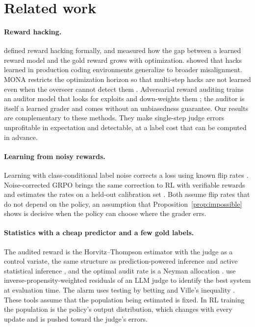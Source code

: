 \section{Related work}
\label{sec:related}

\paragraph{Reward hacking.}
\citet{skalse2022defining} defined reward hacking formally, and \citet{gao2023scaling} measured how the gap between a learned reward model and the gold reward grows with optimization. \citet{macdiarmid2025natural} showed that hacks learned in production coding environments generalize to broader misalignment. MONA restricts the optimization horizon so that multi-step hacks are not learned even when the overseer cannot detect them \citep{farquhar2025mona}. Adversarial reward auditing trains an auditor model that looks for exploits and down-weights them \citep{beigi2026adversarial}; the auditor is itself a learned grader and comes without an unbiasedness guarantee. Our results are complementary to these methods. They make single-step judge errors unprofitable in expectation and detectable, at a label cost that can be computed in advance.

\paragraph{Learning from noisy rewards.}
Learning with class-conditional label noise corrects a loss using known flip rates \citep{natarajan2013noisy}. Noise-corrected GRPO brings the same correction to RL with verifiable rewards and estimates the rates on a held-out calibration set \citep{elmansouri2025noisecorrected}. Both assume flip rates that do not depend on the policy, an assumption that Proposition~\ref{prop:impossible} shows is decisive when the policy can choose where the grader errs.

\paragraph{Statistics with a cheap predictor and a few gold labels.}
The audited reward is the Horvitz--Thompson estimator \citep{horvitz1952} with the judge as a control variate, the same structure as prediction-powered inference \citep{angelopoulos2023ppi} and active statistical inference \citep{zrnic2024active}, and the optimal audit rate is a Neyman allocation \citep{neyman1934}. \citet{ao2026bestarm} use inverse-propensity-weighted residuals of an LLM judge to identify the best system at evaluation time. The alarm uses testing by betting \citep{waudbysmith2024betting} and Ville's inequality \citep{ville1939}. These tools assume that the population being estimated is fixed. In RL training the population is the policy's output distribution, which changes with every update and is pushed toward the judge's errors.

